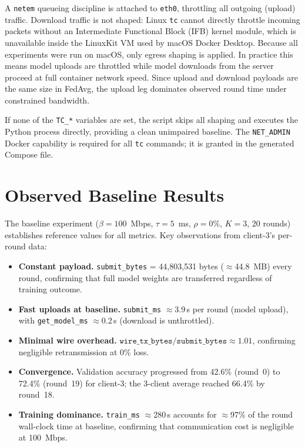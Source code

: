 \documentclass[12pt,a4paper]{report}
\begin{document}
A \texttt{netem} queueing discipline is attached to \texttt{eth0},
throttling all outgoing (upload) traffic.  Download traffic is not
shaped: Linux \texttt{tc} cannot directly throttle incoming packets
without an Intermediate Functional Block (IFB) kernel module, which is
unavailable inside the LinuxKit VM used by macOS Docker Desktop.
Because all experiments were run on macOS, only egress shaping is
applied.  In practice this means model uploads are throttled while
model downloads from the server proceed at full container network speed.
Since upload and download payloads are the same size in FedAvg, the
upload leg dominates observed round time under constrained bandwidth.

If none of the \texttt{TC\_*} variables are set, the script skips all
shaping and executes the Python process directly, providing a clean
unimpaired baseline.  The \texttt{NET\_ADMIN} Docker capability is
required for all \texttt{tc} commands; it is granted in the generated
Compose file.

\section{Observed Baseline Results}

The baseline experiment ($\beta = 100$~Mbps, $\tau = 5$~ms, $\rho = 0\%$,
$K = 3$, 20 rounds) establishes reference values for all metrics.  Key
observations from client-3's per-round data:

\begin{itemize}
  \item \textbf{Constant payload.}  \texttt{submit\_bytes} =
        44{,}803{,}531 bytes ($\approx$44.8~MB) every round, confirming
        that full model weights are transferred regardless of training
        outcome.
  \item \textbf{Fast uploads at baseline.}  \texttt{submit\_ms}
        $\approx$3.9\,s per round (model upload), with
        \texttt{get\_model\_ms} $\approx$0.2\,s (download is unthrottled).
  \item \textbf{Minimal wire overhead.}  $\texttt{wire\_tx\_bytes} /
        \texttt{submit\_bytes} \approx 1.01$, confirming negligible
        retransmission at 0\% loss.
  \item \textbf{Convergence.}  Validation accuracy progressed from
        42.6\% (round~0) to 72.4\% (round~19) for client-3; the 3-client
        average reached 66.4\% by round~18.
  \item \textbf{Training dominance.}  \texttt{train\_ms} $\approx$280\,s
        accounts for $\approx$97\% of the round wall-clock time at
        baseline, confirming that communication cost is negligible at
        100~Mbps.
\end{itemize}
\end{document}
